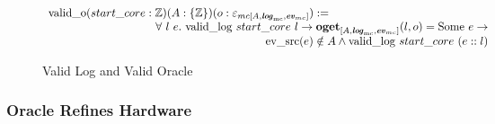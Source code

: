 \begin{figure}

$
\begin{array}{l}
\validoraclekwd (start\_core : \ztype) (A : \set{\ztype}) (o : \mcoracle{A}{\mclog}{\mcevent}) := \ \ \ \ \ \ \ \ \ \ \ \ \ \ \ \ \ \ \ \ \ \ \ \  \ \ \ \ \ \ \ \ \ \ \ \ \ \ \ \ \ \  \\
\hfill \forall\ l \ e .\  \validlog{start\_core}{l} \rightarrow \oget{A}{\mclog}{\mcevent}{l}{o}{e} \rightarrow \\
\hfill \eventsourcefuncnoeq{e} \notin A \wedge \validlog{start\_core}{(\listcons{e}{l})}\\
\end{array}
$

\caption{Valid Log and Valid Oracle}
\label{fig:valid-log-valid-oracle}
\end{figure}




\clearpage

\subsubsection{Oracle Refines Hardware}
\label{subsubsec:oracle-refines-hardware}

